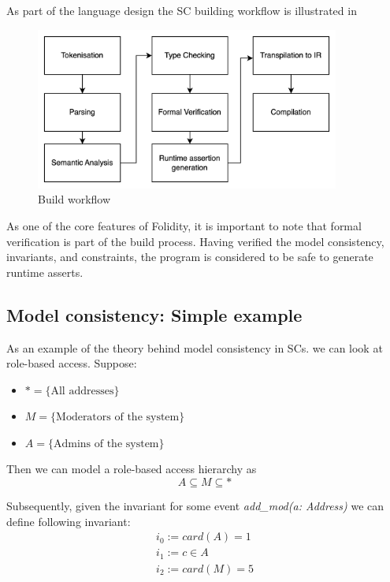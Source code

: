 \documentclass[oneside]{ecsproject}     %
\begin{document}
As part of the language design the SC building workflow is illustrated in 

\begin{figure}[!htb]
  \centering
  \includegraphics[width=10cm]{compilation.png}
  \caption{Build workflow}
  \label{Figure:compilation}
\end{figure}

As one of the core features of Folidity, it is important to note that formal verification is part of the build process.
Having verified the model consistency, invariants, and constraints, the program is considered to be safe to generate runtime asserts.

\newpage
\subsection{Model consistency: Simple example}

As an example of the theory behind model consistency in SCs. we can look at role-based access. Suppose:
\begin{itemize}
  \item $* = \{ \text{All addresses} \}$
  \item $M = \{ \text{Moderators of the system} \}$
  \item $A = \{ \text{Admins of the system} \}$
\end{itemize}

Then we can model a role-based access hierarchy as 
\[ A \subseteq M \subseteq * \]

Subsequently, given the invariant for some event \textit{add\_mod(a: Address)} we can define following invariant:
\begin{equation*}
    \begin{gathered}
      i_0 := card(A) = 1 \\
      i_1 := c \in A \\
      i_2 := card(M) = 5
    \end{gathered}
  \end{equation*}
\end{document}

